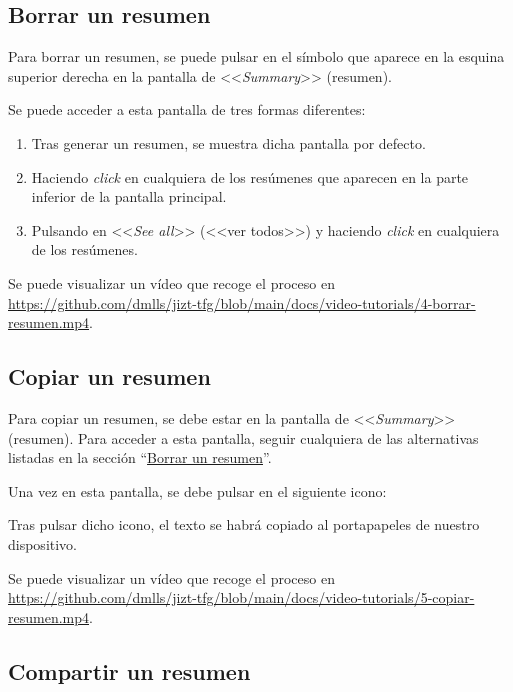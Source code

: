 \subsection{Borrar un resumen} \label{subsection:borrar}

Para borrar un resumen, se puede pulsar en el símbolo que aparece en la esquina superior derecha en la pantalla de <<\emph{Summary}>> (resumen).

Se puede acceder a esta pantalla de tres formas diferentes:

\begin{enumerate}
	\item Tras generar un resumen, se muestra dicha pantalla por defecto.
	
	\item Haciendo \emph{click} en cualquiera de los resúmenes que aparecen en la parte inferior de la pantalla principal.
	
	\item Pulsando en <<\emph{See all}>> (<<ver todos>>) y haciendo \emph{click} en cualquiera de los resúmenes.
\end{enumerate}

Se puede visualizar un vídeo que recoge el proceso en \href{https://github.com/dmlls/jizt-tfg/blob/main/docs/video-tutorials/4-borrar-resumen.mp4}{https://github.com/\newline dmlls/jizt-tfg/blob/main/docs/video-tutorials/4-borrar-resumen.mp4}.

\subsection{Copiar un resumen}

Para copiar un resumen, se debe estar en la pantalla de <<\emph{Summary}>> (resumen). Para acceder a esta pantalla, seguir cualquiera de las alternativas listadas en la sección ``\hyperref[subsection:borrar]{Borrar un resumen}''.

Una vez en esta pantalla, se debe pulsar en el siguiente icono:

Tras pulsar dicho icono, el texto se habrá copiado al portapapeles de nuestro dispositivo.

Se puede visualizar un vídeo que recoge el proceso en \href{https://github.com/dmlls/jizt-tfg/blob/main/docs/video-tutorials/5-copiar-resumen.mp4}{https://github.com/\newline dmlls/jizt-tfg/blob/main/docs/video-tutorials/5-copiar-resumen.mp4}.

\subsection{Compartir un resumen}


